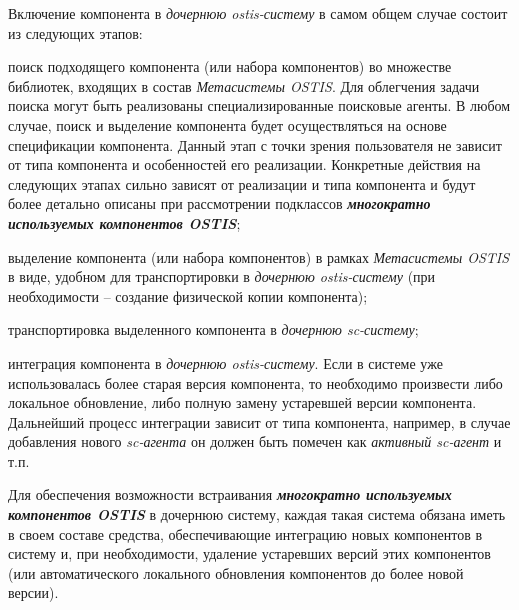 \begin{SCn}
{Включение компонента в \textit{дочернюю ostis-систему} в самом общем случае состоит из следующих этапов:
\begin{scnitemize}
    \item поиск подходящего компонента (или набора компонентов) во множестве библиотек, входящих в состав \textit{Метасистемы OSTIS}. Для облегчения задачи поиска могут быть реализованы специализированные поисковые агенты. В любом случае, поиск и выделение компонента будет осуществляться на основе спецификации компонента. Данный этап с точки зрения пользователя не зависит от типа компонента и особенностей его реализации. Конкретные действия на следующих  этапах сильно зависят от реализации и типа компонента и будут более детально описаны при рассмотрении подклассов \textbf{\textit{многократно используемых компонентов OSTIS}};
    \item выделение компонента (или набора компонентов) в рамках \textit{Метасистемы OSTIS} в виде, удобном для транспортировки в \textit{дочернюю ostis-систему} (при необходимости – создание физической копии компонента);
    \item транспортировка выделенного компонента в \textit{дочернюю sc-систему};
    \item интеграция компонента в \textit{дочернюю ostis-систему}. Если в системе уже использовалась более старая версия компонента, то необходимо произвести либо локальное обновление, либо полную замену устаревшей версии компонента. Дальнейший процесс интеграции зависит от типа компонента, например, в случае добавления нового \textit{sc-агента} он должен быть помечен как \textit{активный sc-агент} и т.п.
\end{scnitemize}

Для обеспечения возможности встраивания \textbf{\textit{многократно используемых компонентов OSTIS}} в дочернюю систему, каждая такая система обязана иметь в своем составе средства, обеспечивающие интеграцию новых компонентов в систему и, при необходимости, удаление устаревших версий этих компонентов (или автоматического локального обновления компонентов до более новой версии).}




\end{SCn}
